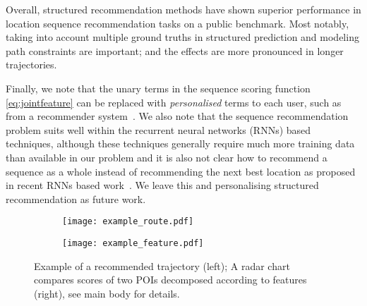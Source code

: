

Overall, structured recommendation methods have shown superior performance in location sequence recommendation tasks on a public benchmark. Most notably, taking into account multiple ground truths in structured prediction and modeling path constraints are important; and the effects are more pronounced in longer trajectories.

Finally, we note that the unary terms in the sequence scoring function \eqref{eq:jointfeature} can be replaced with {\em personalised} terms to each user, such as from a recommender system~\cite{Koren:2009,bpr09}. 
We also note that the sequence recommendation problem suits well within the recurrent neural networks (RNNs) based techniques, 
although these techniques generally require much more training data than available in our problem and 
it is also not clear how to recommend a sequence as a whole instead of recommending the next best location as proposed in recent RNNs based work~\cite{aaai16}.
We leave this and personalising structured recommendation as future work.

\begin{figure}[htbp]
    \centering
    \begin{subfigure}[t]{.47\linewidth} %
        \centering
        \texttt{[image: example\_route.pdf]}
    \end{subfigure}
    \quad
    \begin{subfigure}[t]{.47\linewidth} 
        \centering
        \texttt{[image: example\_feature.pdf]}
    \end{subfigure}
    \caption{Example of a recommended trajectory (left); A radar chart compares scores of two POIs decomposed according to features (right), see main body for details.}
    \label{fig:example}
\end{figure}

